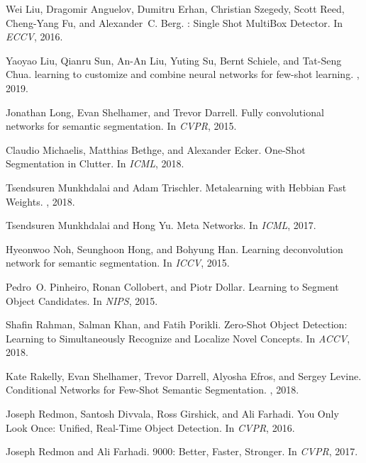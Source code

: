 \documentclass{article}
\begin{document}
{\begin{thebibliography}{10}
Wei Liu, Dragomir Anguelov, Dumitru Erhan, Christian Szegedy, Scott Reed,
  Cheng-Yang Fu, and Alexander~C. Berg.
: {Single} {Shot} {MultiBox} {Detector}.
\newblock In {\em {ECCV}}, 2016.

Yaoyao Liu, Qianru Sun, An{-}An Liu, Yuting Su, Bernt Schiele, and Tat{-}Seng
  Chua.
 learning to customize and combine neural networks for few-shot
  learning.
, 2019.

Jonathan Long, Evan Shelhamer, and Trevor Darrell.
\newblock Fully convolutional networks for semantic segmentation.
\newblock In {\em {CVPR}}, 2015.

Claudio Michaelis, Matthias Bethge, and Alexander Ecker.
\newblock One-{Shot} {Segmentation} in {Clutter}.
\newblock In {\em {ICML}}, 2018.

Tsendsuren Munkhdalai and Adam Trischler.
\newblock Metalearning with {Hebbian} {Fast} {Weights}.
, 2018.

Tsendsuren Munkhdalai and Hong Yu.
\newblock Meta {Networks}.
\newblock In {\em ICML}, 2017.

Hyeonwoo Noh, Seunghoon Hong, and Bohyung Han.
\newblock Learning deconvolution network for semantic segmentation.
\newblock In {\em {ICCV}}, 2015.

Pedro~O. Pinheiro, Ronan Collobert, and Piotr Dollar.
\newblock Learning to {Segment} {Object} {Candidates}.
\newblock In {\em {NIPS}}, 2015.

Shafin Rahman, Salman Khan, and Fatih Porikli.
\newblock Zero-{Shot} {Object} {Detection}: {Learning} to {Simultaneously}
  {Recognize} and {Localize} {Novel} {Concepts}.
\newblock In {\em ACCV}, 2018.

Kate Rakelly, Evan Shelhamer, Trevor Darrell, Alyosha Efros, and Sergey Levine.
\newblock Conditional {Networks} for {Few}-{Shot} {Semantic} {Segmentation}.
, 2018.

Joseph Redmon, Santosh Divvala, Ross Girshick, and Ali Farhadi.
\newblock You {Only} {Look} {Once}: {Unified}, {Real}-{Time} {Object}
  {Detection}.
\newblock In {\em {CVPR}}, 2016.

Joseph Redmon and Ali Farhadi.
9000: {Better}, {Faster}, {Stronger}.
\newblock In {\em {CVPR}}, 2017.


\end{thebibliography}}
\end{document}
